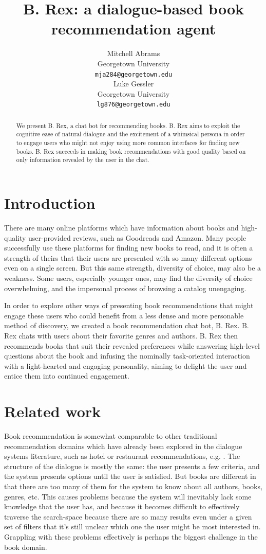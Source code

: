 \documentclass[11pt,a4paper]{article}
\title{B. Rex: a dialogue-based book recommendation agent}
\author{Mitchell Abrams \\
  Georgetown University \\
  {\tt mja284@georgetown.edu} \\\And
  Luke Gessler \\
  Georgetown University \\
  {\tt lg876@georgetown.edu} \\
}
\date{}
\begin{document}
\maketitle
\begin{abstract}
  We present B. Rex, a chat bot for recommending books. B. Rex aims to exploit the cognitive ease of natural dialogue and the excitement of a whimsical persona in order to engage users who might not enjoy using more common interfaces for finding new books. B. Rex succeeds in making book recommendations with good quality based on only information revealed by the user in the chat.
\end{abstract}

\section{Introduction}

There are many online platforms which have information about books and high-quality user-provided reviews, such as Goodreads and Amazon. Many people successfully use these platforms for finding new books to read, and it is often a strength of theirs that their users are presented with so many different options even on a single screen. But this same strength, diversity of choice, may also be a weakness. Some users, especially younger ones, may find the diversity of choice overwhelming, and the impersonal process of browsing a catalog unengaging.

In order to explore other ways of presenting book recommendations that might engage these users who could benefit from a less dense and more personable method of discovery, we created a book recommendation chat bot, B. Rex. B. Rex chats with users about their favorite genres and authors. B. Rex then recommends books that suit their revealed preferences while answering high-level questions about the book and infusing the nominally task-oriented interaction with a light-hearted and engaging personality, aiming to delight the user and entice them into continued engagement.


\section{Related work}

Book recommendation is somewhat comparable to other traditional recommendation domains which have already been explored in the dialogue systems literature, such as hotel or restaurant recommendations, e.g. \citeauthor{pydial} . The structure of the dialogue is mostly the same: the user presents a few criteria, and the system presents options until the user is satisfied. But books are different in that there are too many of them for the system to know about all authors, books, genres, etc. This causes problems because the system will inevitably lack some knowledge that the user has, and because it becomes difficult to effectively traverse the search-space because there are so many results even under a given set of filters that it's still unclear which one the user might be most interested in. Grappling with these problems effectively is perhaps the biggest challenge in the book domain.
\end{document}

